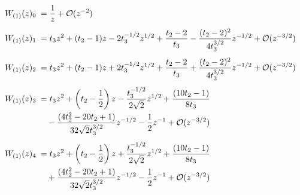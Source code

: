 \begin{sheetasymptotics}
    \begin{align*}
        \sheetlabel{W_{(1)}(z)_0} & ={}   \frac{1}{z} + \mathcal{O}(z^{-2}) \\[4pt]
        \sheetlabel{W_{(1)}(z)_1} & ={}  t_3 z^2 + (t_2 -1)z - 2t_3^{-1/2} z^{1/2} + \frac{t_2 -2}{t_3} - \frac{(t_2-2)^2}{4t_3^{3/2}} z^{-1/2} + \mathcal{O}(z^{-3/2}) \\[4pt]
        \sheetlabel{W_{(1)}(z)_2} & ={}  t_3 z^2 + (t_2 -1)z + 2t_3^{-1/2}z^{1/2} + \frac{t_2 -2}{t_3} + \frac{(t_2-2)^2}{4t_3^{3/2}} z^{-1/2} + \mathcal{O}(z^{-3/2}) \\[4pt]
        \sheetlabel{W_{(1)}(z)_3} & ={}  t_3 z^2 + \left(t_2-\frac12\right) z - \frac{t_3^{-1/2}}{2\sqrt{2}} z^{1/2} + \frac{(10t_2-1)}{8t_3} \\*
                                  & \quad{}- \frac{(4t_2^2 - 20t_2 +1)} {32\sqrt{2}t_3^{3/2}}z^{-1/2} - \frac{1}{2} z^{-1} + \mathcal{O}(z^{-3/2}) \\[4pt]
        \sheetlabel{W_{(1)}(z)_4} & ={}  t_3 z^2 + \left(t_2-\frac12\right) z + \frac{t_3^{-1/2}}{2\sqrt{2}} z^{1/2} + \frac{(10t_2-1)}{8t_3} \\*
                                  & \quad{}+ \frac{(4t_2^2 - 20t_2 +1)}{32\sqrt{2}t_3^{3/2}}z^{-1/2} - \frac{1}{2} z^{-1} + \mathcal{O}(z^{-3/2})
    \end{align*}
\end{sheetasymptotics}%
